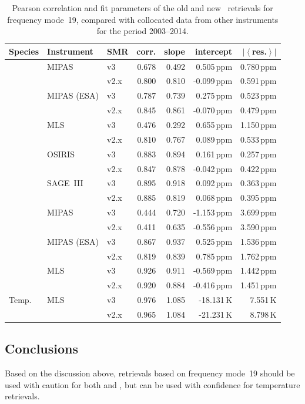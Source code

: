 \begin{table}[tbhp]
\centering
\caption{Pearson correlation and fit parameters of the old and new \smr\
retrievals for frequency mode~19, compared with collocated data from other
instruments for the period 2003--2014.
}
\label{tab:fm19:stats}
\begin{tabular}{lllrrrr}
    \toprule
    \textbf{Species} & \textbf{Instrument} & \textbf{SMR} & \textbf{corr.} & \textbf{slope} & \textbf{intercept} & \textbf{$\left|\left<\right.\right.$res.$\left.\left.\right>\right|$} \\
    \midrule
    \chem{O3}   & MIPAS         & v3    & 0.678 & 0.492 &  0.505\,ppm   & 0.780\,ppm \\
                &               & v2.x  & 0.800 & 0.810 & -0.099\,ppm   & 0.591\,ppm \\
    \cline{2-7}
                & MIPAS (ESA)   & v3    & 0.787 & 0.739 &  0.275\,ppm   & 0.523\,ppm \\
                &               & v2.x  & 0.845 & 0.861 & -0.070\,ppm   & 0.479\,ppm \\
    \cline{2-7}
                & MLS           & v3    & 0.476 & 0.292 & 0.655\,ppm    & 1.150\,ppm \\
                &               & v2.x  & 0.810 & 0.767 & 0.089\,ppm    & 0.533\,ppm \\
    \cline{2-7}
                & OSIRIS        & v3    & 0.883 & 0.894 &  0.161\,ppm   & 0.257\,ppm \\
                &               & v2.x  & 0.847 & 0.878 & -0.042\,ppm   & 0.422\,ppm \\
    \cline{2-7}
                & SAGE~III      & v3    & 0.895 & 0.918 & 0.092\,ppm    & 0.363\,ppm \\
                &               & v2.x  & 0.885 & 0.819 & 0.068\,ppm    & 0.395\,ppm \\
    \midrule
    \chem{H_2O} & MIPAS         & v3    & 0.444 & 0.720 & -1.153\,ppm   & 3.699\,ppm \\
                &               & v2.x  & 0.411 & 0.635 & -0.556\,ppm   & 3.590\,ppm \\
    \cline{2-7}
                & MIPAS (ESA)   & v3    & 0.867 & 0.937 & 0.525\,ppm    & 1.536\,ppm \\
                &               & v2.x  & 0.819 & 0.839 & 0.785\,ppm    & 1.762\,ppm \\
    \cline{2-7}
                & MLS           & v3    & 0.926 & 0.911 & -0.569\,ppm   & 1.442\,ppm \\
                &               & v2.x  & 0.920 & 0.884 & -0.416\,ppm   & 1.451\,ppm \\
    \midrule
    Temp.       & MLS           & v3    & 0.976 & 1.085 & -18.131\,K    & 7.551\,K \\
                &               & v2.x  & 0.965 & 1.084 & -21.231\,K    & 8.798\,K \\
    \bottomrule
\end{tabular}
\end{table}

\subsection{Conclusions}
\label{sec:fm19:conclusions}
Based on the discussion above, retrievals based on frequency mode~19 should be
used with caution for both \chem{O_3} and \chem{H_2O}, but can be used with
confidence for temperature retrievals.
